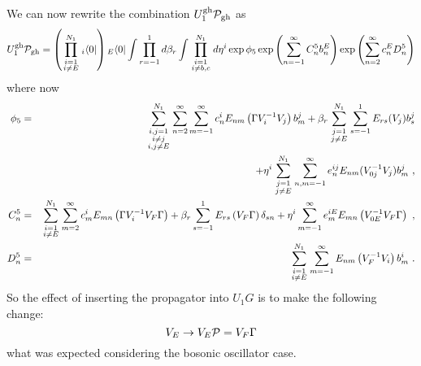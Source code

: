 \documentclass[a4paper,11pt]{article}
\begin{document}
We can now rewrite the combination $U_1^{\rm gh}{\cal P}_{\rm gh}$ as \cite{cg2}
\begin{equation}
U^{\rm gh}_1{\cal P}_{\rm gh} = \left( \prod_{\scriptstyle i=1\atop \scriptstyle i\neq E}^{N_1}{ }_i\langle 0|\right) { }_E\langle 0|\int \prod_{r=-1}^1d\beta _r\int \prod_{\scriptstyle i=1\atop \scriptstyle i\neq b,c}^{N_1}d\eta ^i \exp {\phi _5}\exp \left( \sum_{n=-1}^\infty C_n^5b_n^E\right) \exp \left( \sum_{n=2}^\infty c_n^ED_n^5\right) \end{equation}
where now
\begin{eqnarray}
\phi _5 & = & \sum_{{\scriptstyle i,j=1\atop \scriptstyle i \neq j}\atop \scriptstyle i,j \neq E}^{N_1} \sum_{n=2}^\infty \sum_{m=-1}^\infty c_n^i E_{nm} \left( \Gamma V^{-1}_i V_j\right) b_m^j +\beta _r \sum_{\scriptstyle j=1\atop \scriptstyle j\neq E}^{N_1} \sum_{s=-1}^1 E_{rs}(V_j) b_s^j\nonumber \\ 
 & & +\eta ^i \sum_{\scriptstyle j=1\atop \scriptstyle j\neq E}^{N_1} \sum_{n,m=-1}^\infty e_n^{ij} E_{nm} (V_{0j}^{-1} V_j) b_m^j\ ,\\ 
C_n^5 & = & \sum_{\scriptstyle i=1\atop \scriptstyle i \neq E}^{N_1} \sum_{m=2}^\infty c_m^i E_{mn} \left( \Gamma V^{-1}_i V_F \Gamma \right) +\beta _r \sum_{s=-1}^1 E_{rs} \left( V_F \Gamma \right) \delta _{sn} +\eta ^i \sum_{m=-1}^\infty e_m^{iE} E_{mn} \left( V_{0E}^{-1} V_F\Gamma \right) \ ,\\ 
D_n^5 & = & \sum_{\scriptstyle i=1\atop \scriptstyle i \neq E}^{N_1} \sum_{m=-1}^\infty E_{nm} \left( V^{-1}_F V_i\right) b_m^i\ .
\end{eqnarray}
So the effect of inserting the propagator into $U_1G$ is to make the following change:
\begin{equation}
V_E\rightarrow V_E{\cal P}=V_F\Gamma 
\end{equation}
what was expected considering the bosonic oscillator case.
\end{document}
